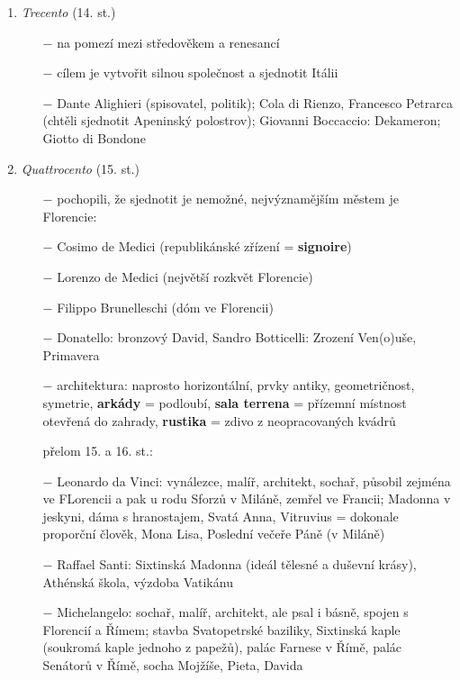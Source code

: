 \documentclass{article}
\begin{document}
\begin{enumerate}
    \vspace{-0.5em}
    \setlength\itemsep{0.15em}
    \item \textit{Trecento} (14. st.)
        \begin{itemize}
            \vspace{-0.5em}
            \setlength\itemsep{0.15em}
            \item[$-$] na pomezí mezi středověkem a renesancí
            \item[$-$] cílem je vytvořit silnou společnost a sjednotit Itálii
            \item[$-$] Dante Alighieri (spisovatel, politik); Cola di Rienzo, Francesco Petrarca (chtěli sjednotit Apeninský polostrov); Giovanni Boccaccio: Dekameron; Giotto di Bondone
        \end{itemize}
    \item \textit{Quattrocento} (15. st.)
    \begin{itemize}
        \vspace{-0.5em}
        \setlength\itemsep{0.15em}
        \item[$-$] pochopili, že sjednotit je nemožné, nejvýznamějším městem je Florencie:
        \item[$-$] Cosimo de Medici (republikánské zřízení = \textbf{signoire})
        \item[$-$] Lorenzo de Medici (největší rozkvět Florencie)
        \item[$-$] Filippo Brunelleschi (dóm ve Florencii)
        \item[$-$] Donatello: bronzový David, Sandro Botticelli: Zrození Ven(o)uše, Primavera
        \item[$-$] architektura: naprosto horizontální, prvky antiky, geometričnost, symetrie, \textbf{arkády} = podloubí, \textbf{sala terrena} = přízemní místnost otevřená do zahrady, \textbf{rustika} = zdivo z neopracovaných kvádrů
        \item[] přelom 15. a 16. st.:
        \item[$-$] Leonardo da Vinci: vynálezce, malíř, architekt, sochař, působil zejména ve FLorencii a pak u rodu Sforzů v Miláně, zemřel ve Francii; Madonna v jeskyni, dáma s hranostajem, Svatá Anna, Vitruvius = dokonale proporční člověk, Mona Lisa, Poslední večeře Páně (v Miláně)
        \item[$-$] Raffael Santi: Sixtinská Madonna (ideál tělesné a duševní krásy), Athénská škola, výzdoba Vatikánu
        \item[$-$] Michelangelo: sochař, malíř, architekt, ale psal i básně, spojen s Florencií a Římem; stavba Svatopetrské baziliky, Sixtinská kaple (soukromá kaple jednoho z papežů), palác Farnese v Římě, palác Senátorů v Římě, socha Mojžíše, Pieta, Davida

\end{itemize}
\end{enumerate}
\end{document}
